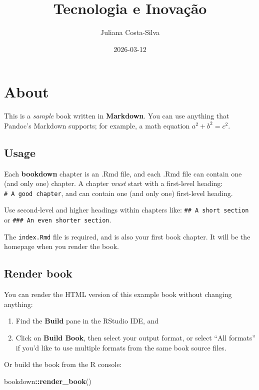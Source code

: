 \documentclass[
]{book}
\title{Tecnologia e Inovação}
\author{Juliana Costa-Silva}
\date{2026-03-12}
\newenvironment{Shaded}{\begin{snugshade}}{\end{snugshade}}
\newcommand{\FunctionTok}[1]{\textcolor[rgb]{0.13,0.29,0.53}{\textbf{#1}}}
\newcommand{\NormalTok}[1]{#1}
\newcommand{\SpecialCharTok}[1]{\textcolor[rgb]{0.81,0.36,0.00}{\textbf{#1}}}
\theoremstyle{definition}
\theoremstyle{definition}
\theoremstyle{definition}
\theoremstyle{definition}
\theoremstyle{remark}
\begin{document}
\maketitle

{
\setcounter{tocdepth}{1}
\tableofcontents
}
\chapter{About}\label{about}

This is a \emph{sample} book written in \textbf{Markdown}. You can use anything that Pandoc's Markdown supports; for example, a math equation \(a^2 + b^2 = c^2\).

\section{Usage}\label{usage}

Each \textbf{bookdown} chapter is an .Rmd file, and each .Rmd file can contain one (and only one) chapter. A chapter \emph{must} start with a first-level heading: \texttt{\#\ A\ good\ chapter}, and can contain one (and only one) first-level heading.

Use second-level and higher headings within chapters like: \texttt{\#\#\ A\ short\ section} or \texttt{\#\#\#\ An\ even\ shorter\ section}.

The \texttt{index.Rmd} file is required, and is also your first book chapter. It will be the homepage when you render the book.

\section{Render book}\label{render-book}

You can render the HTML version of this example book without changing anything:

\begin{enumerate}
\def\labelenumi{\arabic{enumi}.}
\item
  Find the \textbf{Build} pane in the RStudio IDE, and
\item
  Click on \textbf{Build Book}, then select your output format, or select ``All formats'' if you'd like to use multiple formats from the same book source files.
\end{enumerate}

Or build the book from the R console:

\begin{Shaded}
\begin{Highlighting}[]
\NormalTok{bookdown}\SpecialCharTok{::}\FunctionTok{render\_book}\NormalTok{()}
\end{Highlighting}
\end{Shaded}
\end{document}
